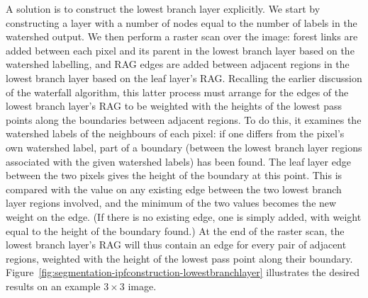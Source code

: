 A solution is to construct the lowest branch layer explicitly. We start by constructing a layer with a number of nodes equal to the number of labels in the watershed output. We then perform a raster scan over the image: forest links are added between each pixel and its parent in the lowest branch layer based on the watershed labelling, and RAG edges are added between adjacent regions in the lowest branch layer based on the leaf layer's RAG. Recalling the earlier discussion of the waterfall algorithm, this latter process must arrange for the edges of the lowest branch layer's RAG to be weighted with the heights of the lowest pass points along the boundaries between adjacent regions. To do this, it examines the watershed labels of the neighbours of each pixel: if one differs from the pixel's own watershed label, part of a boundary (between the lowest branch layer regions associated with the given watershed labels) has been found. The leaf layer edge between the two pixels gives the height of the boundary at this point. This is compared with the value on any existing edge between the two lowest branch layer regions involved, and the minimum of the two values becomes the new weight on the edge. (If there is no existing edge, one is simply added, with weight equal to the height of the boundary found.) At the end of the raster scan, the lowest branch layer's RAG will thus contain an edge for every pair of adjacent regions, weighted with the height of the lowest pass point along their boundary. Figure~\ref{fig:segmentation-ipfconstruction-lowestbranchlayer} illustrates the desired results on an example $3 \times 3$ image.

